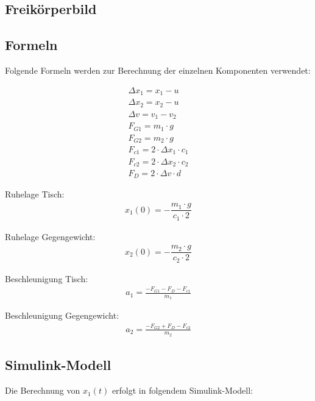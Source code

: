 \documentclass[]{scrartcl}
\begin{document}
\subsection{Freikörperbild}

\subsection{Formeln}
Folgende Formeln werden zur Berechnung der einzelnen Komponenten verwendet:

\begin{align}
\Delta x_{1} = x_{1} - u\\
\Delta x_{2} = x_{2} - u\\
\Delta v = v_{1} - v_{2}\\
F_{G1} = m_{1} \cdot g\\
F_{G2} = m_{2} \cdot g\\
F_{c1} = 2 \cdot \Delta x_{1} \cdot c_{1}\\
F_{c2} = 2 \cdot \Delta x_{2} \cdot c_{2}\\
F_{D} = 2 \cdot \Delta v \cdot d
\end{align}

Ruhelage Tisch:
\begin{align}
x_{1}(0) = - \dfrac{m_{1} \cdot g}{c_{1} \cdot 2}
\end{align}

Ruhelage Gegengewicht:
\begin{align}
x_{2}(0) = - \dfrac{m_{2} \cdot g}{c_{2} \cdot 2}
\end{align}

Beschleunigung Tisch:
\begin{align}
a_{1} = \frac{-F_{G1} - F_{D} - F_{c1}}{m_{1}}
\end{align}

Beschleunigung Gegengewicht:
\begin{align}
a_{2} = \frac{-F_{G2} + F_{D} - F_{c2}}{m_{2}}
\end{align}

\subsection{Simulink-Modell}
Die Berechnung von $x_{1}(t)$ erfolgt in folgendem Simulink-Modell:
\end{document}

